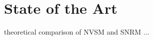 \chapter{State of the Art} \label{chapter:state-of-the-art}

theoretical comparison of NVSM and SNRM ... 

